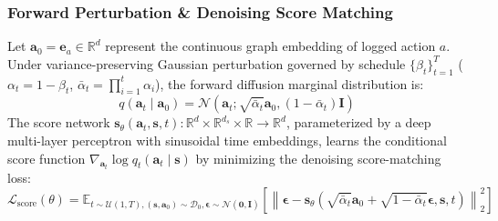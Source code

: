 \documentclass[preprint,12pt,3p]{elsarticle}
\begin{document}
\subsubsection{Forward Perturbation \& Denoising Score Matching}
Let $\mathbf{a}_0 = \mathbf{e}_{a} \in \mathbb{R}^d$ represent the continuous graph embedding of logged action $a$. Under variance-preserving Gaussian perturbation governed by schedule $\{\beta_t\}_{t=1}^T$ ($\alpha_t = 1 - \beta_t$, $\bar{\alpha}_t = \prod_{i=1}^t \alpha_i$), the forward diffusion marginal distribution is:
\begin{equation}
q(\mathbf{a}_t \mid \mathbf{a}_0) = \mathcal{N}\left( \mathbf{a}_t; \sqrt{\bar{\alpha}_t} \mathbf{a}_0, (1 - \bar{\alpha}_t) \mathbf{I} \right)
\end{equation}
The score network $\mathbf{s}_\theta(\mathbf{a}_t, \mathbf{s}, t): \mathbb{R}^d \times \mathbb{R}^{d_s} \times \mathbb{R} \to \mathbb{R}^d$, parameterized by a deep multi-layer perceptron with sinusoidal time embeddings, learns the conditional score function $\nabla_{\mathbf{a}_t} \log q_t(\mathbf{a}_t \mid \mathbf{s})$ by minimizing the denoising score-matching loss:
\begin{equation}
\mathcal{L}_{\mathrm{score}}(\theta) = \mathbb{E}_{t \sim \mathcal{U}(1, T), (\mathbf{s}, \mathbf{a}_0) \sim \mathcal{D}_0, \boldsymbol{\epsilon} \sim \mathcal{N}(\mathbf{0}, \mathbf{I})} \left[ \left\| \boldsymbol{\epsilon} - \mathbf{s}_\theta\left(\sqrt{\bar{\alpha}_t}\mathbf{a}_0 + \sqrt{1 - \bar{\alpha}_t}\boldsymbol{\epsilon}, \mathbf{s}, t\right) \right\|_2^2 \right]
\end{equation}
\end{document}
